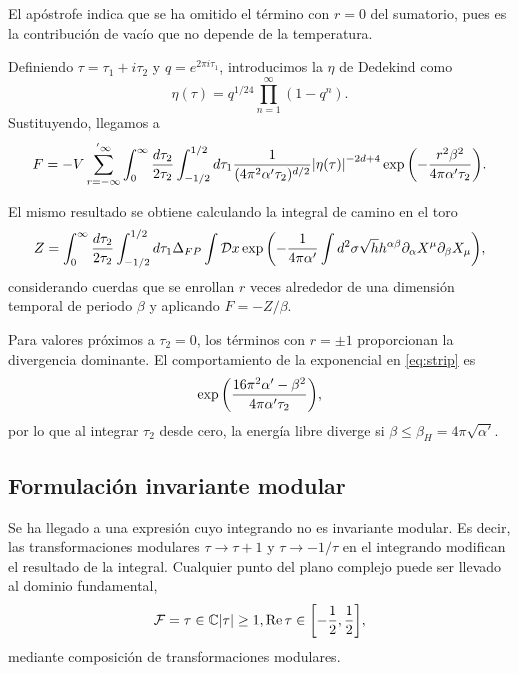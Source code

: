 El apóstrofe indica que se ha omitido el término con $r=0$ del sumatorio, pues es la contribución
de vacío que no depende de la temperatura.

Definiendo $\tau=\tau_1+i\tau_2$ y $q=e^{2\pi i\tau_1}$, introducimos la $\eta$ de 
Dedekind como
\begin{equation}
  \eta(\tau)=q^{1/24}\prod_{n=1}^{\infty} (1-q^n).
\end{equation}
Sustituyendo, llegamos a 
\begin{equation}
  F=-V \sum_{r=-\infty}^{'\infty} \int_0^\infty\frac{d\tau_2}{2\tau_2} \int_{-1/2}^{1/2} d\tau_1  \frac{1}{(4\pi^2\alpha'\tau_2)^{d/2}}
  \abs{\eta(\tau)}^{-2d+4}\exp\qty(-\frac{r^2\beta^2}{4\pi\alpha'\tau_2}).
  \label{eq:strip}
\end{equation}

El mismo resultado se obtiene calculando la integral de camino en el toro
\begin{equation}
  Z= \int_0^\infty\frac{d\tau_2}{2\tau_2} \int_{-1/2}^{1/2} d\tau_1 \Delta_{FP} \int \mathcal Dx
  \exp\qty(-\frac{1}{4\pi\alpha'}\int d^2\sigma \sqrt h h^{\alpha\beta}\partial_\alpha X^\mu \partial_\beta X_\mu),
\end{equation}
considerando cuerdas que se enrollan $r$ veces alrededor de una dimensión temporal de periodo $\beta$
y aplicando $F=-Z/\beta$.

Para valores próximos a $\tau_2=0$, los términos con $r=\pm 1$ proporcionan la divergencia 
dominante.
El comportamiento de la exponencial en \ref{eq:strip} es
\begin{equation}
  \exp\qty(\frac{16\pi^2 \alpha' -\beta^2}{4\pi\alpha'\tau_2}),
\end{equation}
por lo que al integrar $\tau_2$ desde cero, la energía libre diverge si $\beta\leq \beta_H=4\pi\sqrt{\alpha'}$.

\subsection{Formulación invariante modular}
\label{sec:taq}
Se ha llegado a una expresión cuyo integrando no es invariante modular. Es decir, las
transformaciones modulares $\tau\to\tau+1$ y $\tau\to-1/\tau$ en el integrando modifican el resultado
de la integral.
Cualquier punto del plano complejo puede ser llevado al dominio fundamental,
\begin{equation}
  \mathcal F = { \tau \in \mathbb{C} \abs{\tau} \geq 1, \Re\tau \in \qty[-\frac 1 2, \frac 1 2]},
\end{equation}
mediante composición de transformaciones modulares.

